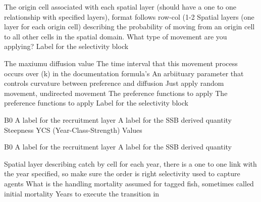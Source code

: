  {The origin cell associated with each spatial layer (should have a one to one relationship with specified layers), format follows row-col (1-2}
 {Spatial layers (one layer for each origin cell) describing the probability of moving from an origin cell to all other cells in the spatial domain.}
 {What type of movement are you applying?}
 {Label for the selectivity block}
\par\textbf{}\par
{} {The maxiumu diffusion value}
 {The time interval that this movement process occurs over (k) in the documentation formula's}
 {An arbiituary parameter that controls curvature between preference and diffusion}
 {Just apply random movement, undirected movement}
 {The preference functions to apply}
 {The preference functions to apply}
 {Label for the selectivity block}
\par\textbf{}\par
\par\textbf{}\par
{} {B0}
 {A label for the recruitment layer}
 {A label for the SSB derived quantity}
 {Steepness}
 {YCS (Year-Class-Strength) Values}
\par\textbf{}\par
{} {B0}
 {A label for the recruitment layer}
 {A label for the SSB derived quantity}
\par\textbf{}\par
{} {Spatial layer describing catch by cell for each year, there is a one to one link with the year specified, so make sure the order is right}
 {selectivity used to capture agents}
 {What is the handling mortality assumed for tagged fish, sometimes called initial mortality}
 {Years to execute the transition in}
\par\par
